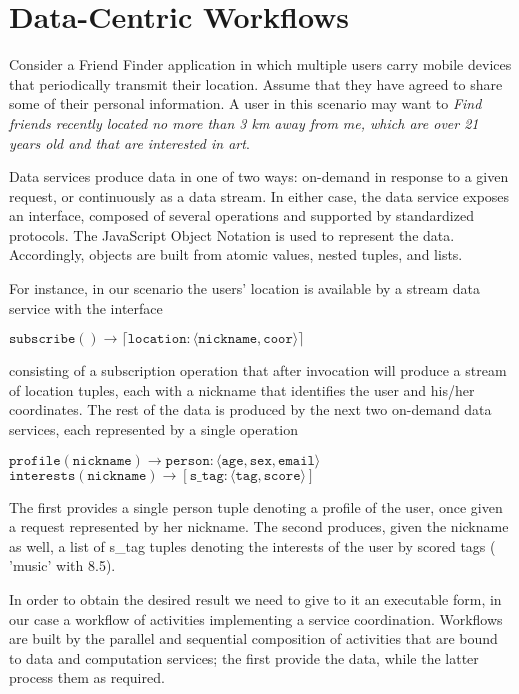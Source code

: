 
\section{Data-Centric Workflows}\label{sec:dataCentricWorkflows}

Consider a Friend Finder application in which multiple users carry mobile devices that periodically transmit their location. Assume that they have agreed to share some of their personal information. A user in this scenario may want to \textit{Find friends recently located no more than 3 km away from me, which are over 21 years old and that are interested in art}.

Data services produce data in one of two ways: on-demand in response to a given request, or continuously as a data stream. In either case, the data service exposes an interface, composed of several operations and supported by standardized protocols. The JavaScript Object Notation is used to represent the data. Accordingly, objects are built from atomic values, nested tuples, and lists.

For instance, in our scenario the users' location is available by a stream data service with the interface
	
$\mathtt{subscribe() \rightarrow \lceil location:\langle nickname, coor\rangle\rceil}$
	
\noindent consisting of a subscription operation that after invocation will produce a stream of location tuples, each with a nickname that identifies the user and his/her coordinates. The rest of the data is produced by the next two on-demand data services, each represented by a single operation
	
$\mathtt{profile(nickname) \rightarrow person:\langle age, sex, email\rangle}$
\\
\hspace*{0.50cm}$\mathtt{interests(nickname) \rightarrow \left[s\_tag:\langle tag, score\rangle\right]}$

The first provides a single person tuple denoting a profile of the user, once given a request represented by her nickname. The second produces, given the nickname as well, a list of s\_tag tuples denoting the interests of the user by scored tags (\eg{} 'music' with 8.5).
	
In order to obtain the desired result we need to give to it an executable form, in our case a workflow of activities implementing a service coordination. Workflows are built by the parallel and sequential composition of activities that are bound to data and computation services; the first provide the data, while the latter process them as required.


